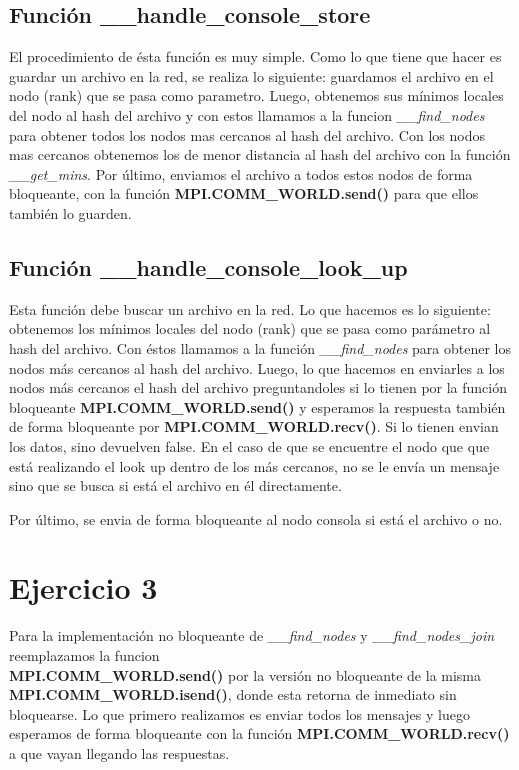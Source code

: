 \subsection{Función \_\_handle\_console\_store}
El procedimiento de ésta función es muy simple. Como lo que tiene que hacer es guardar un archivo en la red, se realiza lo siguiente: guardamos el archivo en el nodo (rank) que se pasa como parametro. Luego, obtenemos sus mínimos locales del nodo al hash del archivo y con estos llamamos a la funcion \emph{\_\_find\_nodes} para obtener todos los nodos mas cercanos al hash del archivo. Con los nodos mas cercanos obtenemos los de menor distancia al hash del archivo con la función \emph{\_\_get\_mins}. Por último, enviamos el archivo a todos estos nodos de forma bloqueante, con la función \textbf{MPI.COMM\_WORLD.send()} para que ellos también lo guarden.


\subsection{Función \_\_handle\_console\_look\_up}
Esta función debe buscar un archivo en la red. Lo que hacemos es lo siguiente: obtenemos los mínimos locales del nodo (rank) que se pasa como parámetro al hash del archivo. Con éstos llamamos a la función \emph{\_\_find\_nodes} para obtener los nodos más cercanos al hash del archivo. Luego, lo que hacemos en enviarles a los nodos más cercanos el hash del archivo preguntandoles si lo tienen por la función bloqueante \textbf{MPI.COMM\_WORLD.send()} y esperamos la respuesta también de forma bloqueante por \textbf{MPI.COMM\_WORLD.recv()}. Si lo tienen envian los datos, sino devuelven false. En el caso de que se encuentre el nodo que que está realizando el look up dentro de los más cercanos, no se le envía un mensaje sino que se busca si está el archivo en él directamente.

Por último, se envia de forma bloqueante al nodo consola si está el archivo o no.

\section{Ejercicio 3}
Para la implementación no bloqueante de \emph{\_\_find\_nodes} y  \emph{\_\_find\_nodes\_join} reemplazamos la funcion \\ \textbf{MPI.COMM\_WORLD.send()} por la versión no bloqueante de la misma \textbf{MPI.COMM\_WORLD.isend()}, donde esta retorna de inmediato sin bloquearse. Lo que primero realizamos es enviar todos los mensajes y luego esperamos de forma bloqueante con la función \textbf{MPI.COMM\_WORLD.recv()} a que vayan llegando las respuestas.


